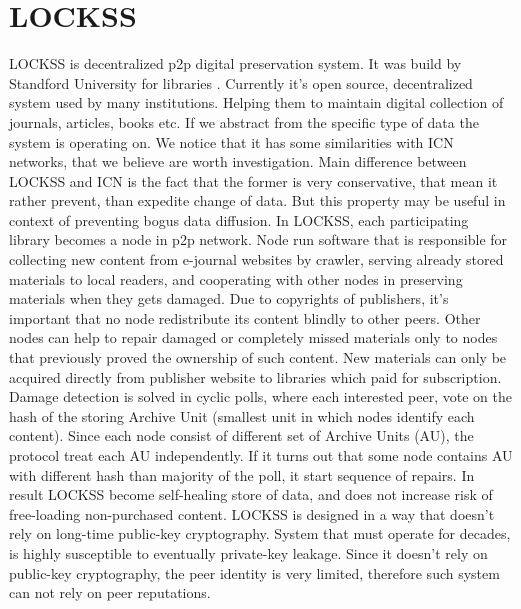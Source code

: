 \documentclass[nostrict]{szablonPG}
\begin{document}
\section{LOCKSS}
LOCKSS is decentralized p2p digital preservation system. It was build by Standford University for libraries \cite{maniatis2003preserving}. Currently it's open source, decentralized system used by many institutions. Helping them to maintain digital collection of journals, articles, books etc. If we abstract from the specific type of data the system is operating on. We notice that it has some similarities with ICN networks, that we believe are worth investigation. Main difference between LOCKSS and ICN is the fact that the former is very conservative, that mean it rather prevent, than expedite change of data. But this property may be useful in context of preventing bogus data diffusion. 
In LOCKSS, each participating library becomes a node in p2p network. Node run software that is responsible for collecting new content from e-journal websites by crawler, serving already stored materials to local readers, and cooperating with other nodes in preserving materials when they gets damaged. 
Due to copyrights of publishers, it's important that no node redistribute its content blindly to other peers. Other nodes can help to repair damaged or completely missed materials only to nodes that previously proved the ownership of such content. New materials can only be acquired directly from publisher website to libraries which paid for subscription. 
Damage detection is solved in cyclic polls, where each interested peer, vote on the hash of the storing Archive Unit (smallest unit in which nodes identify each content). Since each node consist of different set of Archive Units (AU), the protocol treat each AU independently. If it turns out that some node contains AU with different hash than majority of the poll, it start sequence of repairs. In result LOCKSS become self-healing store of data, and does not increase risk of free-loading non-purchased content.
LOCKSS is designed in a way that doesn't rely on long-time public-key cryptography. System that must operate for decades, is highly susceptible to eventually private-key leakage. Since it doesn't rely on public-key cryptography, the peer identity is very limited, therefore such system can not rely on peer reputations.


\end{document}
